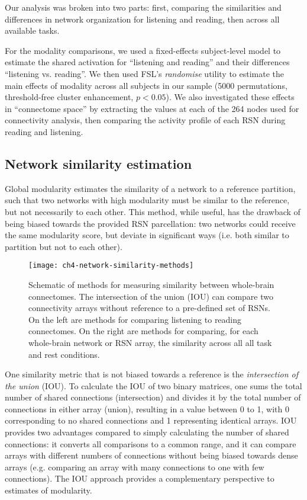Our analysis was broken into two parts: first, comparing the similarities and differences in network organization for listening and reading, then across all available tasks. 

For the modality comparisons, we used a fixed-effects subject-level model to estimate the shared activation for ``listening and reading'' and their differences ``listening vs. reading''. We then used FSL's \textit{randomise} utility to estimate the main effects of modality across all subjects in our sample (5000 permutations, threshold-free cluster enhancement, $p < 0.05$).  We also investigated these effects in ``connectome space'' by extracting the values at each of the 264 nodes used for connectivity analysis, then comparing the activity profile of each RSN during reading and listening.

\subsection{Network similarity estimation}

Global modularity estimates the similarity of a network to a reference partition, such that two networks with high modularity must be similar to the reference, but not necessarily to each other. This method, while useful, has the drawback of being biased towards the provided RSN parcellation: two networks could receive the same modularity score, but deviate in significant ways (i.e. both similar to partition but not to each other). 

\begin{figure}[t]
	\centering
	\texttt{[image: ch4-network-similarity-methods]}
    \caption[Methods for measuring similarity between whole-brain connectomes]{Schematic of methods for measuring similarity between whole-brain connectomes. The intersection of the union (IOU) can compare two connectivity arrays without reference to a pre-defined set of RSNs. On the left are methods for comparing listening to reading connectomes. On the right are methods for comparing, for each whole-brain network or RSN array, the similarity across all all task and rest conditions.}
	\label{fig:ch4-network-similarity-methods}
\end{figure}

One similarity metric that is not biased towards a reference is the \textit{intersection of the union} (IOU). To calculate the IOU of two binary matrices, one sums the total number of shared connections (intersection) and divides it by the total number of connections in either array (union), resulting in a value between 0 to 1, with 0 corresponding to no shared connections and 1 representing identical arrays. IOU provides two advantages compared to simply calculating the number of shared connections: it converts all comparisons to a common range, and it can compare arrays with different numbers of connections without being biased towards dense arrays (e.g. comparing an array with many connections to one with few connections). The IOU approach provides a complementary perspective to estimates of modularity.

